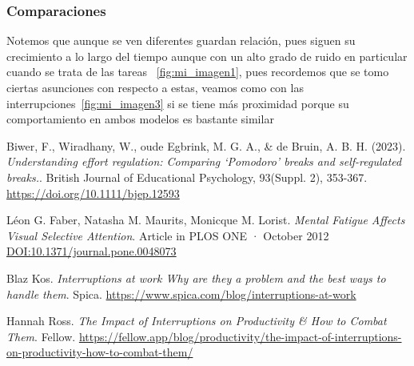 \documentclass[10pt,a4paper,twocolumn]{article}
\begin{document}
\subsubsection*{Comparaciones}
Notemos que aunque se ven diferentes guardan relaci\'on, pues siguen su crecimiento a lo largo del tiempo aunque con un alto grado de ruido en particular cuando se trata de las tareas ~\ref{fig:mi_imagen1}, pues recordemos que se tomo ciertas asunciones con respecto a estas, veamos como con las interrupciones~\ref{fig:mi_imagen3} si se tiene m\'as proximidad porque su comportamiento en ambos modelos es bastante similar 

\begin{thebibliography}{9} 
     Biwer, F., Wiradhany, W., oude Egbrink, M. G. A., \& de Bruin, A. B. H. 
    (2023).
    \textit{Understanding effort regulation: Comparing ‘Pomodoro’ breaks and self-regulated breaks.}. British Journal of Educational Psychology, 93(Suppl. 2), 353-367. \href{https://doi.org/10.1111/bjep.12593}{https://doi.org/10.1111/bjep.12593}


     L\'eon G. Faber, Natasha M. Maurits, Monicque M. Lorist. 
    \textit{Mental Fatigue Affects Visual Selective Attention}. Article  in  PLOS ONE · October 2012 
    \href{DOI:10.1371/journal.pone.0048073}{DOI:10.1371/journal.pone.0048073}

     Blaz Kos. 
    \textit{Interruptions at work Why are they a problem and the best ways to handle them}. 
    Spica.
    \href{https://www.spica.com/blog/interruptions-at-work}{https://www.spica.com/blog/interruptions-at-work}

     Hannah Ross. 
    \textit{The Impact of Interruptions on Productivity \& How to Combat Them}.
    Fellow.
    \href{https://fellow.app/blog/productivity/the-impact-of-interruptions-on-productivity-how-to-combat-them/}{https://fellow.app/blog/productivity/the-impact-of-interruptions-on-productivity-how-to-combat-them/}

\end{thebibliography}
\end{document}
